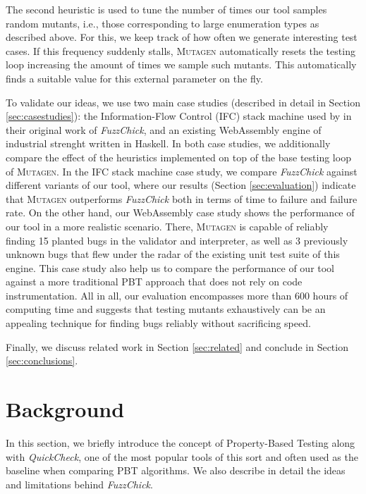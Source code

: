 \documentclass[sigconf, anonymous]{acmart}
\newcommand{\quickcheck}{\textit{QuickCheck}\xspace}
\newcommand{\fuzzchick}{\textit{FuzzChick}\xspace}
\newcommand{\mutagen}{\textsc{Mutagen}\xspace}
\begin{document}
The second heuristic is used to tune the number of times our tool samples random
mutants, i.e., those corresponding to large enumeration types as described above.
%
For this, we keep track of how often we generate interesting test cases.
%
If this frequency suddenly stalls, \mutagen automatically resets the testing
loop increasing the amount of times we sample such mutants.
%
This automatically finds a suitable value for this external parameter on the
fly.


To validate our ideas, we use two main case studies (described in detail in
Section \ref{sec:casestudies}): the Information-Flow Control (IFC) stack machine
used by \citeauthor{lampropoulos2019coverage} in their original work of
\fuzzchick, and an existing WebAssembly engine of industrial strenght written in
Haskell.
%
In both case studies, we additionally compare the effect of the heuristics
implemented on top of the base testing loop of \mutagen.
%
In the IFC stack machine case study, we compare \fuzzchick against different
variants of our tool, where our results (Section \ref{sec:evaluation}) indicate
that \mutagen outperforms \fuzzchick both in terms of time to failure and
failure rate.
%
On the other hand, our WebAssembly case study shows the performance of our tool
in a more realistic scenario.
%
There, \mutagen is capable of reliably finding 15 planted bugs in the validator
and interpreter, as well as 3 previously unknown bugs that flew under the radar
of the existing unit test suite of this engine.
%
This case study also help us to compare the performance of our tool against a
more traditional PBT approach that does not rely on code instrumentation.
%
All in all, our evaluation encompasses more than 600 hours of computing time and
suggests that testing mutants exhaustively can be an appealing technique for
finding bugs reliably without sacrificing speed.


Finally, we discuss related work in Section \ref{sec:related} and conclude
in Section \ref{sec:conclusions}.



\vspace{-5pt}

\section{Background}
\label{sec:background}

In this section, we briefly introduce the concept of Property-Based Testing
along with \quickcheck, one of the most popular tools of this sort and often
used as the baseline when comparing PBT algorithms.
%
We also describe in detail the ideas and limitations behind \fuzzchick.
\end{document}
